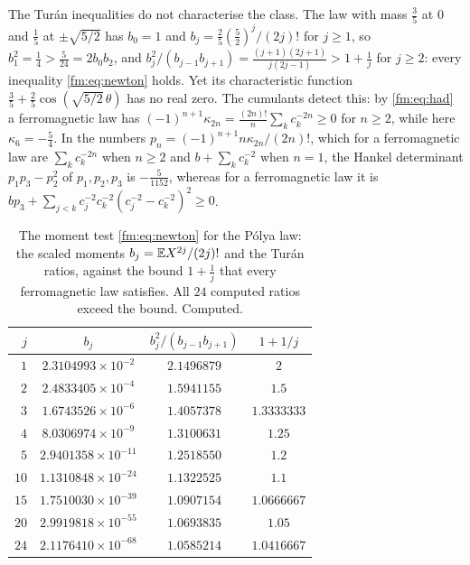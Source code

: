 The Tur\'an inequalities do not characterise the class. The law with mass $\frac35$ at $0$ and $\frac15$ at $\pm\sqrt{5/2}$ has $b_0=1$ and $b_j=\frac25(\frac52)^j/(2j)!$ for $j\ge1$, so $b_1^2=\frac14>\frac5{24}=2b_0b_2$, and $b_j^2/(b_{j-1}b_{j+1})=\frac{(j+1)(2j+1)}{j(2j-1)}>1+\frac1j$ for $j\ge2$: every inequality \eqref{fm:eq:newton} holds. Yet its characteristic function $\frac35+\frac25\cos(\sqrt{5/2}\,\theta)$ has no real zero. The cumulants detect this: by \eqref{fm:eq:had} a ferromagnetic law has $(-1)^{n+1}\kappa_{2n}=\frac{(2n)!}n\sum_kc_k^{-2n}\ge0$ for $n\ge2$, while here $\kappa_6=-\frac54$. In the numbers $p_n=(-1)^{n+1}n\kappa_{2n}/(2n)!$, which for a ferromagnetic law are $\sum_kc_k^{-2n}$ when $n\ge2$ and $b+\sum_kc_k^{-2}$ when $n=1$, the Hankel determinant $p_1p_3-p_2^2$ of $p_1,p_2,p_3$ is $-\frac5{1152}$, whereas for a ferromagnetic law it is $bp_3+\sum_{j<k}c_j^{-2}c_k^{-2}(c_j^{-2}-c_k^{-2})^2\ge0$.

\begin{table}[htbp]
\centering\small
\begin{tabular}{@{}rccc@{}}
\toprule
$j$ & $b_j$ & $b_j^2/(b_{j-1}b_{j+1})$ & $1+1/j$\\
\midrule
$1$ & $2.3104993\times10^{-2}$ & $2.1496879$ & $2$\\
$2$ & $2.4833405\times10^{-4}$ & $1.5941155$ & $1.5$\\
$3$ & $1.6743526\times10^{-6}$ & $1.4057378$ & $1.3333333$\\
$4$ & $8.0306974\times10^{-9}$ & $1.3100631$ & $1.25$\\
$5$ & $2.9401358\times10^{-11}$ & $1.2518550$ & $1.2$\\
$10$ & $1.1310848\times10^{-24}$ & $1.1322525$ & $1.1$\\
$15$ & $1.7510030\times10^{-39}$ & $1.0907154$ & $1.0666667$\\
$20$ & $2.9919818\times10^{-55}$ & $1.0693835$ & $1.05$\\
$24$ & $2.1176410\times10^{-68}$ & $1.0585214$ & $1.0416667$\\
\bottomrule
\end{tabular}
\caption{The moment test \eqref{fm:eq:newton} for the P\'olya law: the scaled moments $b_j=\mathbb{E} X^{2j}/(2j)!$ and the Tur\'an ratios, against the bound $1+\frac1j$ that every ferromagnetic law satisfies. All $24$ computed ratios exceed the bound. Computed.}
\label{fm:tab:newton}
\end{table}

